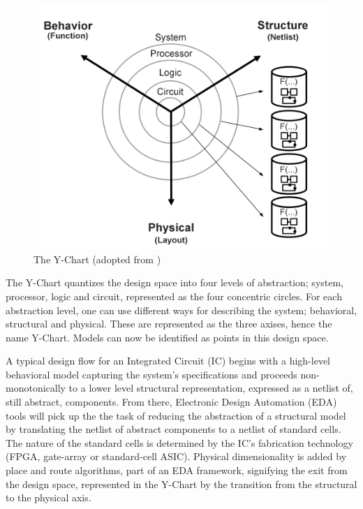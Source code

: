 \documentclass[12pt,twoside]{article}
\begin{document}
\begin{figure}[htb]
\centering
\includegraphics[scale=.45]{Figures/y-chart.png}
\caption{\label{fig:Y-Chart}The Y-Chart (adopted from \cite{Gajski2009})}
\end{figure}


The Y-Chart quantizes the design space into four levels of abstraction; system, processor, logic and circuit, represented as the four concentric circles.
For each abstraction level, one can use different ways for describing the system; behavioral, structural and physical.
These are represented as the three axises, hence the name Y-Chart.
Models can now be identified as points in this design space.

A typical design flow for an Integrated Circuit (IC) begins with a high-level behavioral model capturing the system's specifications and 
proceeds non-monotonically to a lower level structural representation, expressed as a netlist of, still abstract, components.
From there, Electronic Design Automation (EDA) tools will pick up the the task of reducing the abstraction of a structural model by translating the netlist of abstract components to a netlist of standard cells.
The nature of the standard cells is determined by the IC's fabrication technology (FPGA, gate-array or standard-cell ASIC).
Physical dimensionality is added by place and route algorithms, 
part of an EDA framework, 
signifying the exit from the design space, 
represented in the Y-Chart by the transition from the structural to the physical axis.
\end{document}
